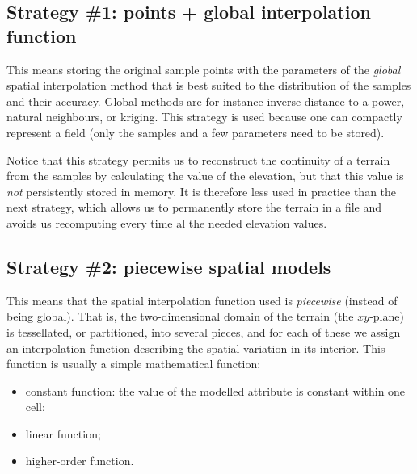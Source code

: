 \subsection{Strategy \#1: points + global interpolation function}
This means storing the original sample points with the parameters of the \emph{global} spatial interpolation method that is best suited to the distribution of the samples and their accuracy.
Global methods are for instance inverse-distance to a power, natural neighbours, or kriging.
This strategy is used because one can compactly represent a field (only the samples and a few parameters need to be stored).

Notice that this strategy permits us to reconstruct the continuity of a terrain from the samples by calculating the value of the elevation, but that this value is \emph{not} persistently stored in memory.
It is therefore less used in practice than the next strategy, which allows us to permanently store the terrain in a file and avoids us recomputing every time al the needed elevation values.


\subsection{Strategy \#2: piecewise spatial models}
This means that the spatial interpolation function used is \emph{piecewise} (instead of being global).
That is, the two-dimensional domain of the terrain (the $xy$-plane) is tessellated, or partitioned, into several pieces, and for each of these we assign an interpolation function describing the spatial variation in its interior.
This function is usually a simple mathematical function:
\begin{itemize}
  \item constant function: the value of the modelled attribute is constant within one cell;
  \item linear function;
  \item higher-order function.
\end{itemize}

%

